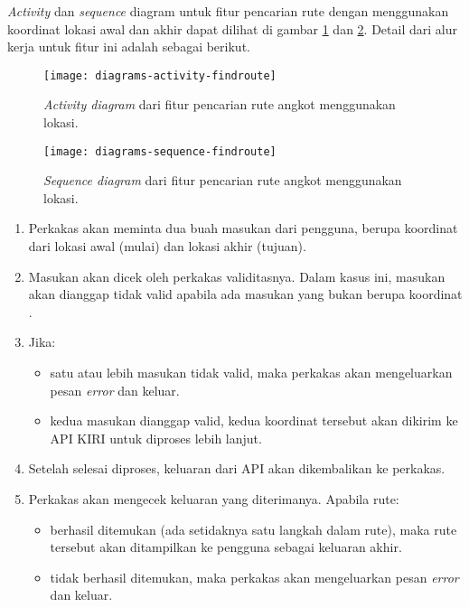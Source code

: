 \textit{Activity} dan \textit{sequence} diagram untuk fitur pencarian rute dengan menggunakan koordinat lokasi awal dan akhir dapat dilihat di gambar \ref{fig:diagrams-activity-findroute} dan \ref{fig:diagrams-sequence-findroute}. Detail dari alur kerja untuk fitur ini adalah sebagai berikut.

\begin{figure}[h]
    \centering
    \texttt{[image: diagrams-activity-findroute]}
    \caption[\textit{Activity diagram} fitur pencarian rute angkot menggunakan koordinat lokasi]{\textit{Activity diagram} dari fitur pencarian rute angkot menggunakan \latlon lokasi.}
    \label{fig:diagrams-activity-findroute}
\end{figure}

\begin{figure}[h]
    \centering
    \texttt{[image: diagrams-sequence-findroute]}
    \caption[\textit{Sequence diagram} fitur pencarian rute angkot menggunakan koordinat lokasi]{\textit{Sequence diagram} dari fitur pencarian rute angkot menggunakan \latlon lokasi.}
    \label{fig:diagrams-sequence-findroute}
\end{figure}

\begin{enumerate}
	\item Perkakas akan meminta dua buah masukan dari pengguna, berupa koordinat \latlon dari lokasi awal (mulai) dan lokasi akhir (tujuan).
	\item Masukan akan dicek oleh perkakas validitasnya. Dalam kasus ini, masukan akan dianggap tidak valid apabila ada masukan yang bukan berupa koordinat \latlon .
	\item Jika:
	
	\begin{itemize}
		\item satu atau lebih masukan tidak valid, maka perkakas akan mengeluarkan pesan \textit{error} dan keluar.
		\item kedua masukan dianggap valid, kedua koordinat tersebut akan dikirim ke API KIRI untuk diproses lebih lanjut.
	\end{itemize}
	 
	\item Setelah selesai diproses, keluaran dari API akan dikembalikan ke perkakas.
	\item Perkakas akan mengecek keluaran yang diterimanya. Apabila rute:
	
	\begin{itemize}
		\item berhasil ditemukan (ada setidaknya satu langkah dalam rute), maka rute tersebut akan ditampilkan ke pengguna sebagai keluaran akhir.
		\item tidak berhasil ditemukan, maka perkakas akan mengeluarkan pesan \textit{error} dan keluar.
	\end{itemize}
	
\end{enumerate}

